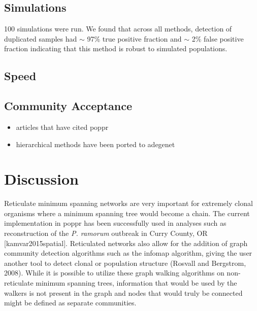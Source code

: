 \documentclass{frontiersSCNS} %
\begin{document}
\subsection*{Simulations}\label{simulations}

100 simulations were run. We found that across all methods, detection of
duplicated samples had \(\sim\) 97\% true positive fraction and \(\sim\)
2\% false positive fraction indicating that this method is robust to
simulated populations.

\subsection*{Speed}\label{speed}

\subsection*{Community Acceptance}\label{community-acceptance}

\begin{itemize}
\itemsep1pt\parskip0pt
\item
  articles that have cited poppr
\item
  hierarchical methods have been ported to adegenet
\end{itemize}

\section*{Discussion}\label{discussion}

Reticulate minimum spanning networks are very important for extremely
clonal organisms where a minimum spanning tree would become a chain. The
current implementation in poppr has been successfully used in analyses
such as reconstruction of the \emph{P. ramorum} outbreak in Curry
County, OR {[}kamvar2015spatial{]}. Reticulated networks also allow for
the addition of graph community detection algorithms such as the infomap
algorithm, giving the user another tool to detect clonal or population
structure (Rosvall and Bergstrom, 2008). While it is possible to utilize
these graph walking algorithms on non-reticulate minimum spanning trees,
information that would be used by the walkers is not present in the
graph and nodes that would truly be connected might be defined as
separate communities.
\end{document}
